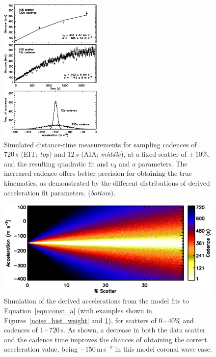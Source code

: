 \documentclass[structabstract]{aa}
\begin{document}
\begin{figure}[!t]
\begin{center}
\includegraphics[width = 0.45\textwidth]{images/cad_hist_jpb.eps}
\caption{Simulated distance-time measurements for sampling cadences of $720\,s$ (EIT; \emph{top}) and $12\,s$ (AIA; \emph{middle}), at a fixed scatter of $\pm\,10\%$, and the resulting quadratic fit and $v_0$ and $a$ parameters. The increased cadence offers better precision for obtaining the true kinematics, as demonstrated by the different distributions of derived acceleration fit parameters. (\emph{bottom}).}
\label{cad_hist_weight}
\end{center}
\end{figure}

\begin{figure}[!b]
\begin{center}
\includegraphics[scale=0.53, trim=20 10 0 20]{images/fig_noise_cad.eps}
\caption{Simulation of the derived accelerations from the model fits to Equation~\ref{eqn:const_a} (with examples shown in Figures~\ref{noise_hist_weight} and \ref{cad_hist_weight}), for scatters of 0\,--\,40\% and cadences of 1\,--\,720\,s. As shown, a decrease in both the data scatter and the cadence time improves the chances of obtaining the correct acceleration value, being $-150$\,m\,s$^{-2}$ in this model coronal wave case.}
\label{noise_test_image}
\end{center}
\end{figure}
\end{document}
